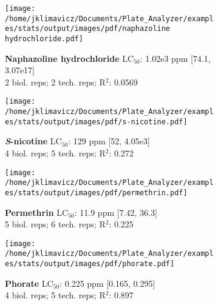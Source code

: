 \documentclass{article}
\begin{document}
\begin{figure}[thp!]
   \begin{subfigure}{0.500\textwidth}
      \centering
      \texttt{[image: /home/jklimavicz/Documents/Plate\_Analyzer/examples/stats/output/images/pdf/naphazoline hydrochloride.pdf]}
      \vspace{-0.05cm}
      \caption*{\textbf{Naphazoline hydrochloride} LC$_{50}$: 1.02e3 ppm [74.1, 3.07e17] \\ 
2 biol. reps; 2 tech. reps; R$^2$: 0.0569}
      \vspace{0.1cm}
   \end{subfigure}%
   \begin{subfigure}{0.500\textwidth}
      \centering
      \texttt{[image: /home/jklimavicz/Documents/Plate\_Analyzer/examples/stats/output/images/pdf/s-nicotine.pdf]}
      \vspace{-0.05cm}
      \caption*{\textbf{\textit{S}-nicotine} LC$_{50}$: 129 ppm [52, 4.05e3] \\ 
4 biol. reps; 5 tech. reps; R$^2$: 0.272}
      \vspace{0.1cm}
   \end{subfigure}%
\vspace{-0.1cm}
   \begin{subfigure}{0.500\textwidth}
      \centering
      \texttt{[image: /home/jklimavicz/Documents/Plate\_Analyzer/examples/stats/output/images/pdf/permethrin.pdf]}
      \vspace{-0.05cm}
      \caption*{\textbf{Permethrin} LC$_{50}$: 11.9 ppm [7.42, 36.3] \\ 
5 biol. reps; 6 tech. reps; R$^2$: 0.225}
      \vspace{0.1cm}
   \end{subfigure}%
   \begin{subfigure}{0.500\textwidth}
      \centering
      \texttt{[image: /home/jklimavicz/Documents/Plate\_Analyzer/examples/stats/output/images/pdf/phorate.pdf]}
      \vspace{-0.05cm}
      \caption*{\textbf{Phorate} LC$_{50}$: 0.225 ppm [0.165, 0.295] \\ 
4 biol. reps; 5 tech. reps; R$^2$: 0.897}
      \vspace{0.1cm}
   \end{subfigure}%
\vspace{-0.1cm}
   \begin{subfigure}{0.500\textwidth}
      \centering

\end{subfigure}
\end{figure}
\end{document}
